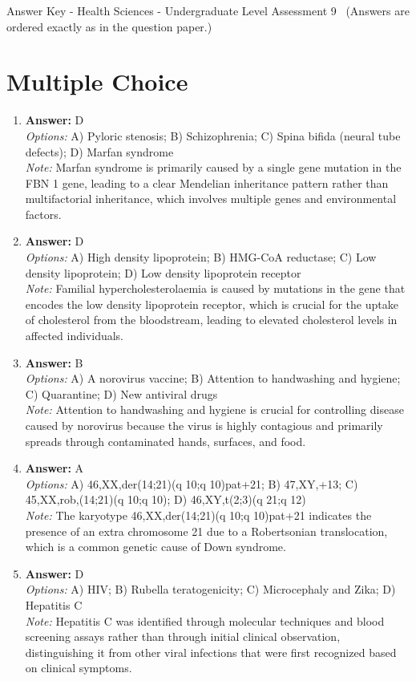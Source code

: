 \documentclass[12pt]{article}
\begin{document}
\begin{center}
Answer Key - Health Sciences - Undergraduate Level Assessment 9 \
\small (Answers are ordered exactly as in the question paper.)
\end{center}

\section*{Multiple Choice}
\begin{enumerate}[label=\arabic*.]
\item \textbf{Answer:} D
\\ \textit{Options:} A) Pyloric stenosis; B) Schizophrenia; C) Spina bifida (neural tube defects); D) Marfan syndrome
\\ \textit{Note:} Marfan syndrome is primarily caused by a single gene mutation in the FBN 1 gene, leading to a clear Mendelian inheritance pattern rather than multifactorial inheritance, which involves multiple genes and environmental factors.
\item \textbf{Answer:} D
\\ \textit{Options:} A) High density lipoprotein; B) HMG-CoA reductase; C) Low density lipoprotein; D) Low density lipoprotein receptor
\\ \textit{Note:} Familial hypercholesterolaemia is caused by mutations in the gene that encodes the low density lipoprotein receptor, which is crucial for the uptake of cholesterol from the bloodstream, leading to elevated cholesterol levels in affected individuals.
\item \textbf{Answer:} B
\\ \textit{Options:} A) A norovirus vaccine; B) Attention to handwashing and hygiene; C) Quarantine; D) New antiviral drugs
\\ \textit{Note:} Attention to handwashing and hygiene is crucial for controlling disease caused by norovirus because the virus is highly contagious and primarily spreads through contaminated hands, surfaces, and food.
\item \textbf{Answer:} A
\\ \textit{Options:} A) 46,XX,der(14;21)(q 10;q 10)pat+21; B) 47,XY,+13; C) 45,XX,rob,(14;21)(q 10;q 10); D) 46,XY,t(2;3)(q 21;q 12)
\\ \textit{Note:} The karyotype 46,XX,der(14;21)(q 10;q 10)pat+21 indicates the presence of an extra chromosome 21 due to a Robertsonian translocation, which is a common genetic cause of Down syndrome.
\item \textbf{Answer:} D
\\ \textit{Options:} A) HIV; B) Rubella teratogenicity; C) Microcephaly and Zika; D) Hepatitis C
\\ \textit{Note:} Hepatitis C was identified through molecular techniques and blood screening assays rather than through initial clinical observation, distinguishing it from other viral infections that were first recognized based on clinical symptoms.
\end{enumerate}
\end{document}

